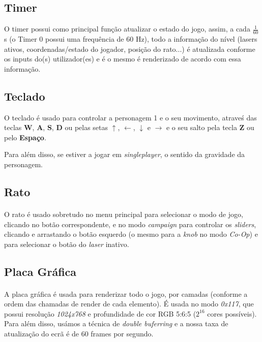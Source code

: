 \documentclass{report}
\begin{document}
\subsection{Timer}

O timer possui como principal função atualizar o estado do jogo, assim, a cada $\frac{1}{60}$s (o Timer 0 possui uma frequência de 60 Hz), todo a informação do nível (lasers ativos, coordenadas/estado do jogador, posição do rato...) é atualizada conforme os inputs do(s) utilizador(es) e é o mesmo é renderizado de acordo com essa informação.

\subsection{Teclado}

O teclado é usado para controlar a personagem 1 e o seu movimento, atraveś das teclas \textbf{W}, \textbf{A}, \textbf{S}, \textbf{D} ou pelas setas $\uparrow$, $\leftarrow$, $\downarrow$ e $\rightarrow$ e o seu salto pela tecla \textbf{Z} ou pelo \textbf{Espaço}.

Para além disso, se estiver a jogar em \textit{singleplayer}, o sentido da gravidade da personagem.

\subsection{Rato}

\paragraph{}
O rato é usado sobretudo no menu principal para selecionar o modo de jogo, clicando no botão correspondente, e no modo \textit{campaign} para controlar os \textit{sliders}, clicando e arrastando o botão esquerdo (o mesmo para a \textit{knob} no modo \textit{Co-Op}) e para selecionar o botão do \textit{laser} inativo.  

\subsection{Placa Gráfica}

\paragraph{}
A placa gráfica é usada para renderizar todo o jogo, por camadas (conforme a ordem das chamadas de render de cada elemento). É usada no modo \textit{0x117}, que possui resolução \textit{1024x768} e profundidade de cor RGB 5:6:5 ($2^{16}$ cores possíveis).
Para além disso, usámos a técnica de \textit{double buferring} e a nossa taxa de atualização do ecrã é de 60 frames por segundo.
\end{document}

